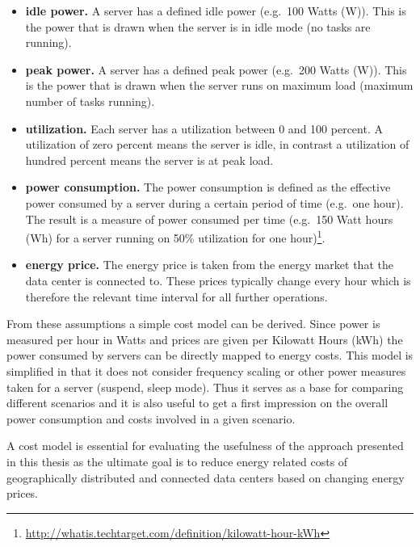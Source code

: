 \begin{itemize}

\item \textbf{idle power.} A server has a defined idle power (e.g.~100 Watts (W)). This is the power that is drawn when the server is in idle mode (no tasks are running). 

\item \textbf{peak power.} A server has a defined peak power (e.g.~200 Watts (W)). This is the power that is drawn when the server runs on maximum load (maximum number of tasks running). 

\item \textbf{utilization.} Each server has a utilization between 0 and 100 percent. A utilization of zero percent means the server is idle, in contrast a utilization of hundred percent means the server is at peak load. 

\item \textbf{power consumption.} The power consumption is defined as the effective power consumed by a server during a certain period of time (e.g.~one hour). The result is a measure of power consumed per time (e.g.~150 Watt hours (Wh) for a server running on 50\% utilization for one hour)\footnote{\url{http://whatis.techtarget.com/definition/kilowatt-hour-kWh}}. %

\item \textbf{energy price.} The energy price is taken from the energy market that the data center is connected to. These prices typically change every hour which is therefore the relevant time interval for all further operations. 

\end{itemize}

From these assumptions a simple cost model can be derived. Since power is measured per hour in Watts and prices are given per Kilowatt Hours (kWh) the power consumed by servers can be directly mapped to energy costs. This model is simplified in that it does not consider frequency scaling or other power measures taken for a server (suspend, sleep mode). Thus it serves as a base for comparing different scenarios and it is also useful to get a first impression on the overall power consumption and costs involved in a given scenario. 

A cost model is essential for evaluating the usefulness of the approach presented in this thesis as the ultimate goal is to reduce energy related costs of geographically distributed and connected data centers based on changing energy prices. 



